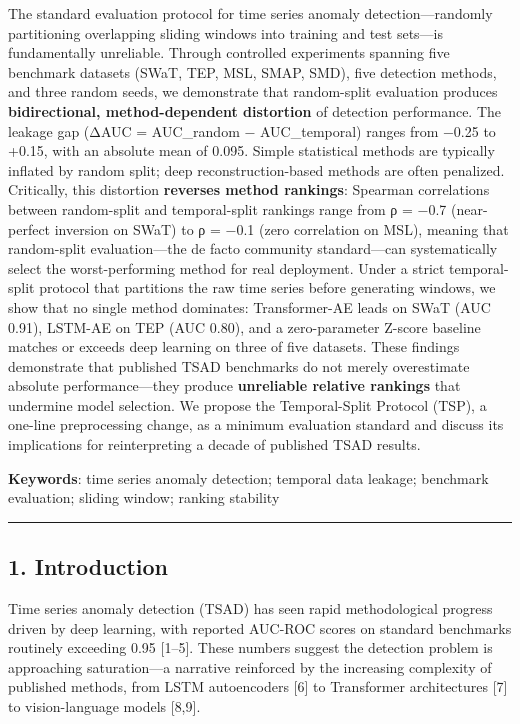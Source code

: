 \documentclass[
]{article}
\begin{document}
The standard evaluation protocol for time series anomaly
detection---randomly partitioning overlapping sliding windows into
training and test sets---is fundamentally unreliable. Through controlled
experiments spanning five benchmark datasets (SWaT, TEP, MSL, SMAP,
SMD), five detection methods, and three random seeds, we demonstrate
that random-split evaluation produces \textbf{bidirectional,
method-dependent distortion} of detection performance. The leakage gap
(ΔAUC = AUC\_random − AUC\_temporal) ranges from −0.25 to +0.15, with an
absolute mean of 0.095. Simple statistical methods are typically
inflated by random split; deep reconstruction-based methods are often
penalized. Critically, this distortion \textbf{reverses method
rankings}: Spearman correlations between random-split and temporal-split
rankings range from ρ = −0.7 (near-perfect inversion on SWaT) to ρ =
−0.1 (zero correlation on MSL), meaning that random-split
evaluation---the de facto community standard---can systematically select
the worst-performing method for real deployment. Under a strict
temporal-split protocol that partitions the raw time series before
generating windows, we show that no single method dominates:
Transformer-AE leads on SWaT (AUC 0.91), LSTM-AE on TEP (AUC 0.80), and
a zero-parameter Z-score baseline matches or exceeds deep learning on
three of five datasets. These findings demonstrate that published TSAD
benchmarks do not merely overestimate absolute performance---they
produce \textbf{unreliable relative rankings} that undermine model
selection. We propose the Temporal-Split Protocol (TSP), a one-line
preprocessing change, as a minimum evaluation standard and discuss its
implications for reinterpreting a decade of published TSAD results.

\textbf{Keywords}: time series anomaly detection; temporal data leakage;
benchmark evaluation; sliding window; ranking stability

\begin{center}\rule{0.5\linewidth}{0.5pt}\end{center}

\subsection{1. Introduction}\label{introduction}

Time series anomaly detection (TSAD) has seen rapid methodological
progress driven by deep learning, with reported AUC-ROC scores on
standard benchmarks routinely exceeding 0.95 {[}1--5{]}. These numbers
suggest the detection problem is approaching saturation---a narrative
reinforced by the increasing complexity of published methods, from LSTM
autoencoders {[}6{]} to Transformer architectures {[}7{]} to
vision-language models {[}8,9{]}.
\end{document}
